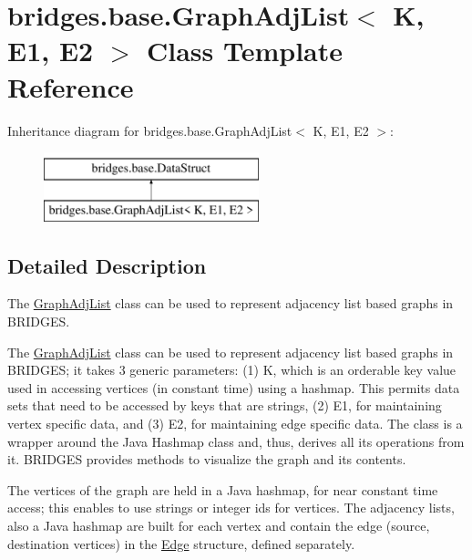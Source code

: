 \hypertarget{classbridges_1_1base_1_1_graph_adj_list}{}\section{bridges.\+base.\+Graph\+Adj\+List$<$ K, E1, E2 $>$ Class Template Reference}
\label{classbridges_1_1base_1_1_graph_adj_list}
Inheritance diagram for bridges.\+base.\+Graph\+Adj\+List$<$ K, E1, E2 $>$\+:\begin{figure}[H]
\begin{center}
\leavevmode
\includegraphics[height=2.000000cm]{classbridges_1_1base_1_1_graph_adj_list}
\end{center}
\end{figure}


\subsection{Detailed Description}
The \hyperlink{classbridges_1_1base_1_1_graph_adj_list}{Graph\+Adj\+List} class can be used to represent adjacency list based graphs in B\+R\+I\+D\+G\+ES. 

The \hyperlink{classbridges_1_1base_1_1_graph_adj_list}{Graph\+Adj\+List} class can be used to represent adjacency list based graphs in B\+R\+I\+D\+G\+ES; it takes 3 generic parameters\+: (1) K, which is an orderable key value used in accessing vertices (in constant time) using a hashmap. This permits data sets that need to be accessed by keys that are strings, (2) E1, for maintaining vertex specific data, and (3) E2, for maintaining edge specific data. The class is a wrapper around the Java Hashmap class and, thus, derives all its operations from it. B\+R\+I\+D\+G\+ES provides methods to visualize the graph and its contents.

The vertices of the graph are held in a Java hashmap, for near constant time access; this enables to use strings or integer ids for vertices. The adjacency lists, also a Java hashmap are built for each vertex and contain the edge (source, destination vertices) in the \hyperlink{classbridges_1_1base_1_1_edge}{Edge} structure, defined separately.

